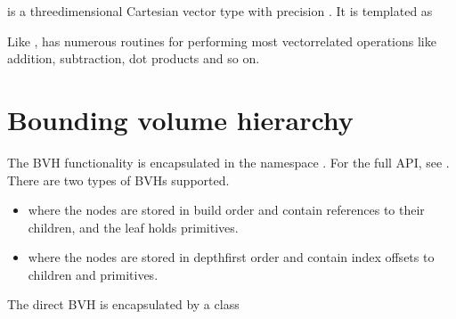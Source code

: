 \documentclass[letterpaper,10pt,english]{sphinxmanual}
\begin{document}
\sphinxAtStartPar
{} is a three\sphinxhyphen{}dimensional Cartesian vector type with precision .
It is templated as

\begin{sphinxVerbatim}[commandchars=\\\{\}]
  
    
     
      \PYG{p}{[}\PYG{p}{]} 
\end{sphinxVerbatim}

\sphinxAtStartPar
Like ,  has numerous routines for performing most vector\sphinxhyphen{}related operations like addition, subtraction, dot products and so on.

\sphinxstepscope


\section{Bounding volume hierarchy}
\label{\detokenize{ImplemBVH:bounding-volume-hierarchy}}\label{\detokenize{ImplemBVH:chap-implembvh}}\label{\detokenize{ImplemBVH::doc}}
\sphinxAtStartPar
The BVH functionality is encapsulated in the namespace .
For the full API, see .
There are two types of BVHs supported.
\begin{itemize}
\item {} 
\sphinxAtStartPar
{} where the nodes are stored in build order and contain references to their children, and the leaf holds primitives.

\item {} 
\sphinxAtStartPar
{} where the nodes are stored in depth\sphinxhyphen{}first order and contain index offsets to children and primitives.

\end{itemize}

\sphinxAtStartPar
The direct BVH is encapsulated by a class

\begin{sphinxVerbatim}[commandchars=\\\{\}]
        
 
\end{sphinxVerbatim}
\end{document}
